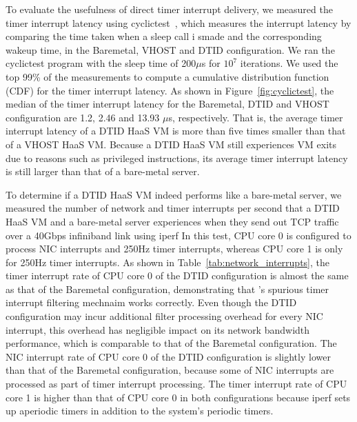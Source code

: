 To evaluate the usefulness of direct timer interrupt delivery, we 
measured the timer interrupt latency using cyclictest~\cite{cyclictest}, which 
measures the interrupt latency by comparing the time taken when a sleep 
call i smade and the corresponding wakeup time,  in the Baremetal, VHOST and DTID configuration.
We ran the cyclictest program with the sleep time of 200$\mu$s for $10^7$
iterations. 
We used the top 99\% of the measurements to compute a cumulative distribution function (CDF)
for the timer interrupt latency. As shown in Figure~\ref{fig:cyclictest}, the 
median of the timer interrupt latency for the Baremetal, DTID and
VHOST configuration are 1.2, 2.46 and 13.93 $\mu$s, respectively.
That is, the average timer interrupt latency of a DTID HaaS VM is 
more than five times smaller than that of a VHOST HaaS VM.
Because a DTID HaaS VM still experiences VM exits due to reasons such as privileged instructions,
its average timer interrupt latency is still larger than that of a bare-metal server.


To determine if a DTID HaaS VM indeed performs like a bare-metal server,
we measured the number of network and timer interrupts per second that a DTID HaaS VM and a bare-metal server
experiences when they send out TCP traffic over a 40Gbps infiniband link using iperf 
In this test, CPU core 0 is configured to process NIC interrupts and 250Hz timer interrupts, whereas CPU core 1 is only for 
250Hz timer interrupts.
As shown in Table~\ref{tab:network_interrupts},
the timer interrupt rate of CPU core 0 of the DTID configuration is almost the same as that of the Baremetal configuration, 
demonstrating that \sna's spurious timer interrupt filtering mechnaim works correctly. 
Even though the DTID configuration may incur additional filter processing overhead for every NIC interrupt,
this overhead has negligible impact on its network bandwidth performance, which is comparable to that of the Baremetal 
configuration.   
The NIC interrupt rate of CPU core 0 of the DTID configuration is slightly lower than that of the Baremetal configuration, 
because some of NIC interrupts are processed as part of timer interrupt processing.
The timer interrupt rate of CPU core 1 is higher than that of CPU core 0 in both configurations because iperf sets up aperiodic
timers in addition to the system's periodic timers. 




